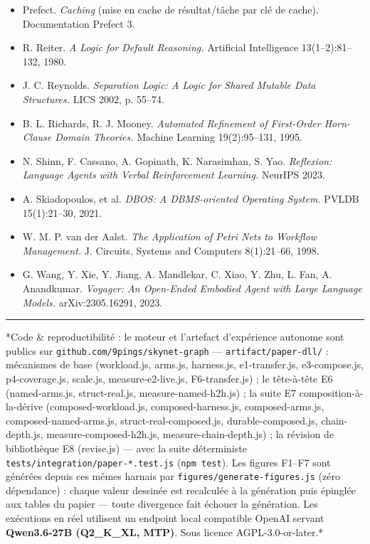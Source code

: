 \documentclass[11pt]{article}
\begin{document}
\begin{itemize}
\item Prefect. \emph{Caching} (mise en cache de résultat/tâche par clé de cache). Documentation Prefect 3.
\item R. Reiter. \emph{A Logic for Default Reasoning.} Artificial Intelligence 13(1–2):81–132, 1980.
\item J. C. Reynolds. \emph{Separation Logic: A Logic for Shared Mutable Data Structures.} LICS 2002, p. 55–74.
\item B. L. Richards, R. J. Mooney. \emph{Automated Refinement of First-Order Horn-Clause Domain Theories.} Machine Learning 19(2):95–131, 1995.
\item N. Shinn, F. Cassano, A. Gopinath, K. Narasimhan, S. Yao. \emph{Reflexion: Language Agents with Verbal Reinforcement Learning.} NeurIPS 2023.
\item A. Skiadopoulos, et al. \emph{DBOS: A DBMS-oriented Operating System.} PVLDB 15(1):21–30, 2021.
\item W. M. P. van der Aalst. \emph{The Application of Petri Nets to Workflow Management.} J. Circuits, Systems and Computers 8(1):21–66, 1998.
\item G. Wang, Y. Xie, Y. Jiang, A. Mandlekar, C. Xiao, Y. Zhu, L. Fan, A. Anandkumar. \emph{Voyager: An Open-Ended Embodied Agent with Large Language Models.} arXiv:2305.16291, 2023.
\end{itemize}

\medskip\hrule\medskip

*Code \& reproductibilité : le moteur et l'artefact d'expérience autonome sont publics sur \texttt{github.com/\allowbreak{}9pings/\allowbreak{}skynet-graph} — \texttt{artifact/\allowbreak{}paper-dll/\allowbreak{}} : mécanismes de base (workload.js, arms.js, harness.js, e1-transfer.js, e3-compose.js, p4-coverage.js, scale.js, measure-e2-live.js, F6-transfer.js) ; le tête-à-tête E6 (named-arms.js, struct-real.js, measure-named-h2h.js) ; la suite E7 composition-à-la-dérive (composed-workload.js, composed-harness.js, composed-arms.js, composed-named-arms.js, struct-real-composed.js, durable-composed.js, chain-depth.js, measure-composed-h2h.js, measure-chain-depth.js) ; la révision de bibliothèque E8 (revise.js) — avec la suite déterministe \texttt{tests/\allowbreak{}integration/\allowbreak{}paper-*.test.js} (\texttt{npm test}). Les figures F1–F7 sont générées depuis ces mêmes harnais par \texttt{figures/\allowbreak{}generate-figures.js} (zéro dépendance) : chaque valeur dessinée est recalculée à la génération puis épinglée aux tables du papier — toute divergence fait échouer la génération. Les exécutions en réel utilisent un endpoint local compatible OpenAI servant \textbf{Qwen3.6-27B (Q2\_K\_XL, MTP)}. Sous licence AGPL-3.0-or-later.*
\end{document}
